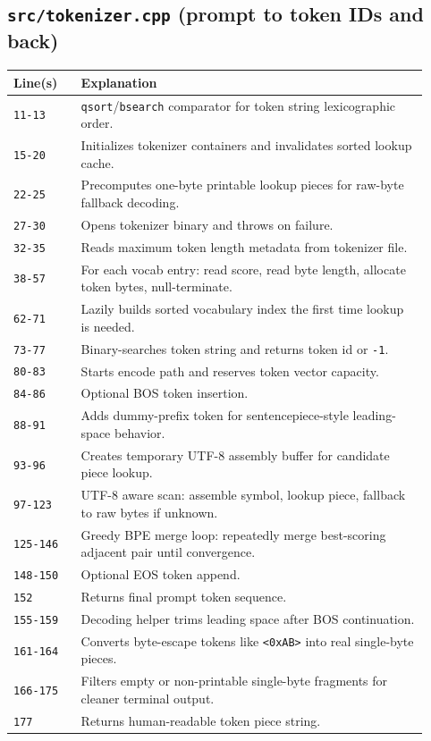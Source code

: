 \documentclass[11pt]{article}
\begin{document}
\subsection{\texttt{src/tokenizer.cpp} (prompt to token IDs and back)}
\begin{longtable}{p{0.15\linewidth} p{0.77\linewidth}}
\toprule
\textbf{Line(s)} & \textbf{Explanation} \\
\midrule
\endhead
\texttt{11-13} & \texttt{qsort}/\texttt{bsearch} comparator for token string lexicographic order. \\
\texttt{15-20} & Initializes tokenizer containers and invalidates sorted lookup cache. \\
\texttt{22-25} & Precomputes one-byte printable lookup pieces for raw-byte fallback decoding. \\
\texttt{27-30} & Opens tokenizer binary and throws on failure. \\
\texttt{32-35} & Reads maximum token length metadata from tokenizer file. \\
\texttt{38-57} & For each vocab entry: read score, read byte length, allocate token bytes, null-terminate. \\
\texttt{62-71} & Lazily builds sorted vocabulary index the first time lookup is needed. \\
\texttt{73-77} & Binary-searches token string and returns token id or \texttt{-1}. \\
\texttt{80-83} & Starts encode path and reserves token vector capacity. \\
\texttt{84-86} & Optional BOS token insertion. \\
\texttt{88-91} & Adds dummy-prefix token for sentencepiece-style leading-space behavior. \\
\texttt{93-96} & Creates temporary UTF-8 assembly buffer for candidate piece lookup. \\
\texttt{97-123} & UTF-8 aware scan: assemble symbol, lookup piece, fallback to raw bytes if unknown. \\
\texttt{125-146} & Greedy BPE merge loop: repeatedly merge best-scoring adjacent pair until convergence. \\
\texttt{148-150} & Optional EOS token append. \\
\texttt{152} & Returns final prompt token sequence. \\
\texttt{155-159} & Decoding helper trims leading space after BOS continuation. \\
\texttt{161-164} & Converts byte-escape tokens like \texttt{<0xAB>} into real single-byte pieces. \\
\texttt{166-175} & Filters empty or non-printable single-byte fragments for cleaner terminal output. \\
\texttt{177} & Returns human-readable token piece string. \\
\bottomrule
\end{longtable}
\end{document}
